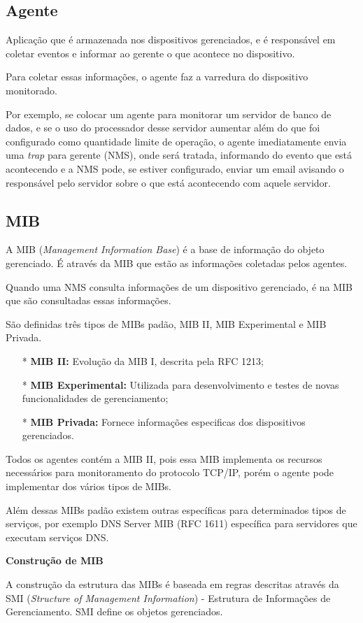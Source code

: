 \documentclass[12pt, brazil, ruledheader, pnumromarab,normaltoc]{abnt}
\begin{document}
\subsection{Agente}
Aplicação que é armazenada nos dispositivos gerenciados, e é responsável em coletar eventos e informar ao gerente o que acontece no dispositivo.
\par
Para coletar essas informações, o agente faz a varredura do dispositivo monitorado.
\par
Por exemplo, se colocar um agente para monitorar um servidor de banco de dados, e se o uso do processador desse servidor aumentar além do que foi configurado como quantidade limite de operação, o agente imediatamente envia uma \emph{trap} para gerente (NMS), onde será tratada, informando do evento que está acontecendo e a NMS pode, se estiver configurado, enviar um email avisando o responsável pelo servidor sobre o que está acontecendo com aquele servidor.

\subsection{MIB}
A MIB (\emph{Management Information Base}) é a base de informação do objeto gerenciado. É através da MIB que estão as informações coletadas pelos agentes.
\par
Quando uma NMS consulta informações de um dispositivo gerenciado, é na MIB que são consultadas essas informações.
\par
São definidas três tipos de MIBs padão, MIB II, MIB Experimental e MIB Privada.
\begin{enumerate}
\item[*] {\textbf{MIB II:}} Evolução da MIB I, descrita pela RFC 1213;
\item[*] {\textbf{MIB Experimental:}} Utilizada para desenvolvimento e testes de novas funcionalidades de gerenciamento;
\item[*] {\textbf{MIB Privada:}} Fornece informações especificas dos dispositivos gerenciados.
\end{enumerate}

\par
Todos os agentes contém a MIB II, pois essa MIB implementa os recursos necessários para monitoramento do protocolo TCP/IP, porém o agente pode implementar dos vários tipos de MIBs.
\par
Além dessas MIBs padão existem outras específicas para determinados tipos de serviços, por exemplo DNS Server MIB (RFC 1611) específica para servidores que executam serviços DNS.
\par
\textbf{Construção de MIB}
\par 
A construção da estrutura das MIBs é baseada em regras descritas através da SMI (\emph{Structure of Management Information}) - Estrutura de Informações de Gerenciamento. SMI define os objetos gerenciados.
\end{document}
